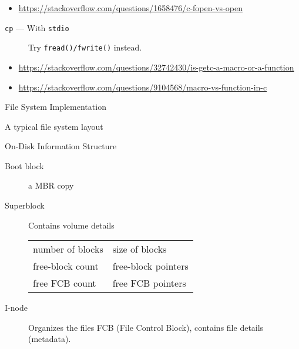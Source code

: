 \begin{itemize}
\item \url{https://stackoverflow.com/questions/1658476/c-fopen-vs-open}
\end{itemize}

\begin{frame}{\texttt{cp} --- {\small With} \texttt{stdio}}
  \begin{center}
  \end{center}
  \begin{description}
  \item[\hw] Try \texttt{fread()/fwrite()} instead.
  \end{description}
\end{frame}

\begin{itemize}
\item \url{https://stackoverflow.com/questions/32742430/is-getc-a-macro-or-a-function}
\item \url{https://stackoverflow.com/questions/9104568/macro-vs-function-in-c}
\end{itemize}

\begin{frame}{File System Implementation}
  \begin{iblock}{A typical file system layout}
    \begin{center}
    \end{center}
  \end{iblock}
  \begin{center}
  \end{center}
\end{frame}

\begin{frame}{On-Disk Information Structure}
  \begin{description}
  \item[Boot block] a MBR copy
  \item[Superblock] Contains volume details
    \begin{center}
      \begin{tabular}{ll}
        number of blocks& size of blocks\\
        free-block count& free-block pointers\\
        free FCB count& free FCB pointers
      \end{tabular}
    \end{center}
  \item[I-node] Organizes the files \alert{FCB (File Control Block)},
    contains file details (metadata).
  \end{description}
\end{frame}

